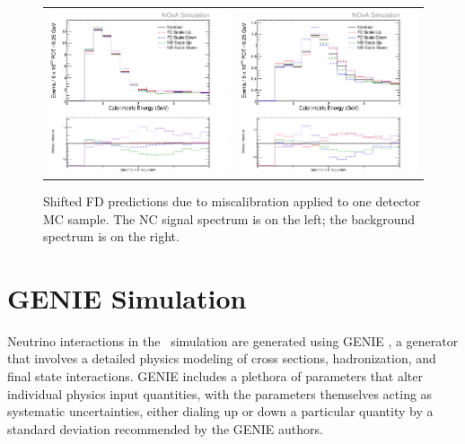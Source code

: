 \begin{figure}[p]
  \centering
  \begin{tabular}{c c}
    \includegraphics[width=.47\textwidth]{figures/Systs/cNCEXCalibRelSysts.png} &
    \includegraphics[width=.47\textwidth]{figures/Systs/cBGEXCalibRelSysts.png} \\
  \end{tabular}
  \caption[Shifted FD Predictions Due to Miscalibration at One Detector]{Shifted FD predictions due to miscalibration applied to one detector MC sample. The NC signal spectrum is on the left; the background spectrum is on the right.}
  \label{fig:SystCalibRel}
\end{figure}

\section{GENIE Simulation}
\label{sec:SystGENIE}

Neutrino interactions in the \nova~simulation are generated using GENIE \cite{ref:GENIE}, a generator that involves a detailed physics modeling of cross sections, hadronization, and final state interactions. GENIE includes a plethora of parameters that alter individual physics input quantities, with the parameters themselves acting as systematic uncertainties, either dialing up or down a particular quantity by a standard deviation recommended by the GENIE authors.

